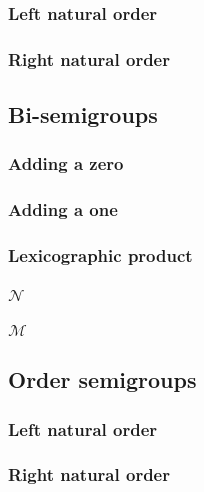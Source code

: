 \documentclass[10pt]{article}
\begin{document}
\subsubsection{Left natural order}
\label{sec:llte:rules} 
 
\subsubsection{Right natural order}
\label{sec:llte:rules} 
 

\subsection{Bi-semigroups} 
\label{sec:bisemigroups:rules} 
\subsubsection{Adding a zero} 
\label{sec:addzero:rules} 
 
\subsubsection{Adding a one} 
\label{sec:addone:rules} 
 
\subsubsection{Lexicographic product} 
\label{sec:bsllex:rules} 
 
\subsubsection{$\mathcal{N}$}
\label{sec:bsN:rules} 
 
\subsubsection{$\mathcal{M}$}
\label{sec:bsM:rules} 
 

\subsection{Order semigroups} 
\label{sec:ordersemigroups:rules} 
\subsubsection{Left natural order}
\label{sec:osllte:rules} 
 
\subsubsection{Right natural order}
\label{sec:osllte:rules} 
 
\end{document}
